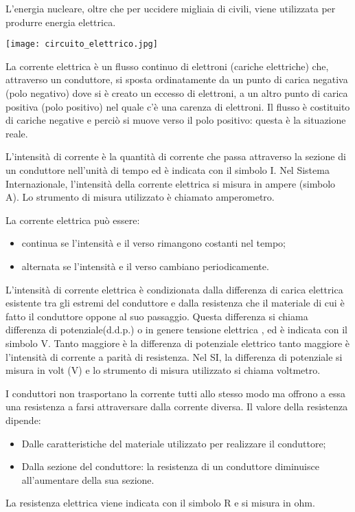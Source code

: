 L’energia nucleare, oltre che per uccidere migliaia di civili, viene utilizzata per produrre energia elettrica.

\texttt{[image: circuito\_elettrico.jpg]}

La corrente elettrica è un flusso continuo di elettroni (cariche elettriche) che, attraverso un conduttore, si sposta ordinatamente da un punto di carica negativa (polo negativo) dove si è creato un eccesso di elettroni, a un altro punto di carica positiva (polo positivo) nel quale c’è una carenza di elettroni. Il flusso è costituito di cariche negative e perciò si muove verso il polo positivo: questa è la situazione reale.

L’intensità di corrente è la quantità di corrente che passa attraverso la sezione di un conduttore nell’unità di tempo ed è indicata con il simbolo I. Nel Sistema Internazionale, l’intensità della corrente elettrica si misura in ampere (simbolo A). Lo strumento di misura utilizzato è chiamato amperometro.

La corrente elettrica può essere:
\begin{itemize}
  \item continua se l’intensità e il verso rimangono costanti nel tempo;
  \item alternata se l’intensità e il verso cambiano periodicamente.
\end{itemize}

L’intensità di corrente elettrica è condizionata dalla differenza di carica elettrica esistente tra gli estremi del conduttore e dalla resistenza che il materiale di cui è fatto il conduttore oppone al suo passaggio. Questa differenza si chiama differenza di potenziale(d.d.p.) o in genere tensione elettrica , ed è indicata con il simbolo V. Tanto maggiore è la differenza di potenziale elettrico tanto maggiore è l’intensità di corrente a parità di resistenza. Nel SI, la differenza di potenziale si misura in volt (V) e lo strumento di misura utilizzato si chiama voltmetro.

I conduttori non trasportano la corrente tutti allo stesso modo ma offrono a essa una resistenza a farsi attraversare dalla corrente diversa. Il valore della resistenza dipende:
\begin{itemize}
  \item Dalle caratteristiche del materiale utilizzato per realizzare il conduttore;
  \item Dalla sezione del conduttore: la resistenza di un conduttore diminuisce all’aumentare della sua sezione.
\end{itemize}
La resistenza elettrica viene indicata con il simbolo R e si misura in ohm.
